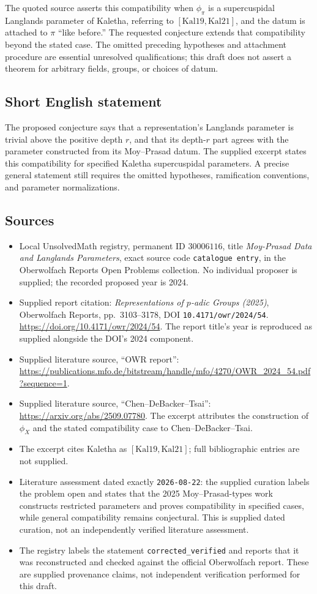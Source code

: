 \documentclass[11pt]{article}
\begin{document}
The quoted source asserts this compatibility when \(\phi_\pi\) is a supercuspidal Langlands parameter of Kaletha, referring to \([\mathrm{Kal19},\mathrm{Kal21}]\), and the datum is attached to \(\pi\) ``like before.'' The requested conjecture extends that compatibility beyond the stated case. The omitted preceding hypotheses and attachment procedure are essential unresolved qualifications; this draft does not assert a theorem for arbitrary fields, groups, or choices of datum.
\subsection{Short English statement}
The proposed conjecture says that a representation's Langlands parameter is trivial above the positive depth \(r\), and that its depth-\(r\) part agrees with the parameter constructed from its Moy--Prasad datum. The supplied excerpt states this compatibility for specified Kaletha supercuspidal parameters. A precise general statement still requires the omitted hypotheses, ramification conventions, and parameter normalizations.
\subsection{Sources}
\begin{itemize}
\item Local UnsolvedMath registry, permanent ID \(30006116\), title \emph{Moy-Prasad Data and Langlands Parameters}, exact source code \texttt{catalogue entry}, in the Oberwolfach Reports Open Problems collection. No individual proposer is supplied; the recorded proposed year is 2024.
\item Supplied report citation: \emph{Representations of \(p\)-adic Groups (2025)}, Oberwolfach Reports, pp.~3103--3178, DOI \texttt{10.4171/owr/2024/54}. \url{https://doi.org/10.4171/owr/2024/54}. The report title's year is reproduced as supplied alongside the DOI's 2024 component.
\item Supplied literature source, ``OWR report'': \url{https://publications.mfo.de/bitstream/handle/mfo/4270/OWR_2024_54.pdf?sequence=1}.
\item Supplied literature source, ``Chen--DeBacker--Tsai'': \url{https://arxiv.org/abs/2509.07780}. The excerpt attributes the construction of \(\phi_X\) and the stated compatibility case to Chen--DeBacker--Tsai.
\item The excerpt cites Kaletha as \([\mathrm{Kal19},\mathrm{Kal21}]\); full bibliographic entries are not supplied.
\item Literature assessment dated exactly \texttt{2026-08-22}: the supplied curation labels the problem open and states that the 2025 Moy--Prasad-types work constructs restricted parameters and proves compatibility in specified cases, while general compatibility remains conjectural. This is supplied dated curation, not an independently verified literature assessment.
\item The registry labels the statement \texttt{corrected\_verified} and reports that it was reconstructed and checked against the official Oberwolfach report. These are supplied provenance claims, not independent verification performed for this draft.
\end{itemize}
\end{document}
